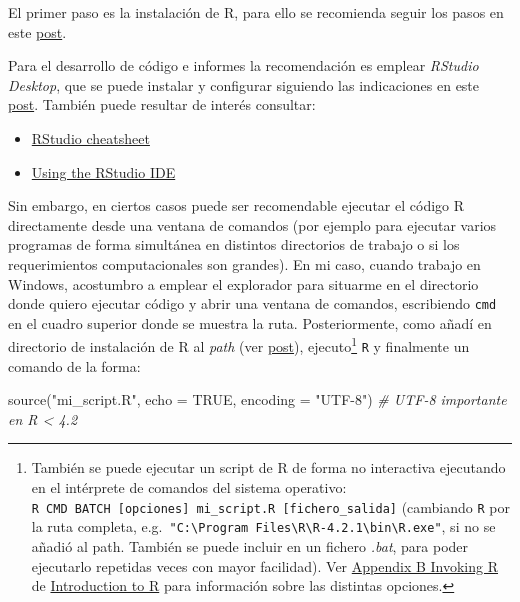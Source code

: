 \documentclass[
]{book}
\newenvironment{Shaded}{\begin{snugshade}}{\end{snugshade}}
\newcommand{\AttributeTok}[1]{\textcolor[rgb]{0.77,0.63,0.00}{#1}}
\newcommand{\CommentTok}[1]{\textcolor[rgb]{0.56,0.35,0.01}{\textit{#1}}}
\newcommand{\ConstantTok}[1]{\textcolor[rgb]{0.00,0.00,0.00}{#1}}
\newcommand{\FunctionTok}[1]{\textcolor[rgb]{0.00,0.00,0.00}{#1}}
\newcommand{\NormalTok}[1]{#1}
\newcommand{\StringTok}[1]{\textcolor[rgb]{0.31,0.60,0.02}{#1}}
\theoremstyle{break}
\theoremstyle{nonumberplain}
\begin{document}
El primer paso es la instalación de R, para ello se recomienda seguir los pasos en este \href{https://rubenfcasal.github.io/post/instalacion-de-r}{post}.

Para el desarrollo de código e informes la recomendación es emplear \emph{RStudio Desktop}, que se puede instalar y configurar siguiendo las indicaciones en este \href{https://rubenfcasal.github.io/post/instalacion-de-rstudio}{post}.
También puede resultar de interés consultar:

\begin{itemize}
\item
  \href{https://posit.co/wp-content/uploads/2022/10/rstudio-ide-1.pdf}{RStudio cheatsheet}
\item
  \href{https://support.posit.co/hc/en-us/sections/200107586-Using-the-RStudio-IDE}{Using the RStudio IDE}
\end{itemize}

Sin embargo, en ciertos casos puede ser recomendable ejecutar el código R directamente desde una ventana de comandos (por ejemplo para ejecutar varios programas de forma simultánea en distintos directorios de trabajo o si los requerimientos computacionales son grandes).
En mi caso, cuando trabajo en Windows, acostumbro a emplear el explorador para situarme en el directorio donde quiero ejecutar código y abrir una ventana de comandos, escribiendo \texttt{cmd} en el cuadro superior donde se muestra la ruta.
Posteriormente, como añadí en directorio de instalación de R al \emph{path} (ver \href{https://rubenfcasal.github.io/post/instalacion-de-r/\#rtools}{post}), ejecuto\footnote{También se puede ejecutar un script de R de forma no interactiva ejecutando en el intérprete de comandos del sistema operativo: \texttt{R\ CMD\ BATCH\ {[}opciones{]}\ mi\_script.R\ {[}fichero\_salida{]}} (cambiando \texttt{R} por la ruta completa, e.g.~\texttt{"C:\textbackslash{}Program\ Files\textbackslash{}R\textbackslash{}R-4.2.1\textbackslash{}bin\textbackslash{}R.exe"}, si no se añadió al path. También se puede incluir en un fichero \emph{.bat}, para poder ejecutarlo repetidas veces con mayor facilidad). Ver \href{https://cran.r-project.org/doc/manuals/r-release/R-intro.html\#Invoking-R}{Appendix B Invoking R} de \href{https://cran.r-project.org/doc/manuals/r-release/R-intro.html}{Introduction to R} para información sobre las distintas opciones.} \texttt{R} y finalmente un comando de la forma:

\begin{Shaded}
\begin{Highlighting}[]
\FunctionTok{source}\NormalTok{(}\StringTok{"mi\_script.R"}\NormalTok{, }\AttributeTok{echo =} \ConstantTok{TRUE}\NormalTok{, }\AttributeTok{encoding =} \StringTok{"UTF{-}8"}\NormalTok{) }\CommentTok{\# UTF{-}8 importante en R \textless{} 4.2}
\end{Highlighting}
\end{Shaded}
\end{document}
